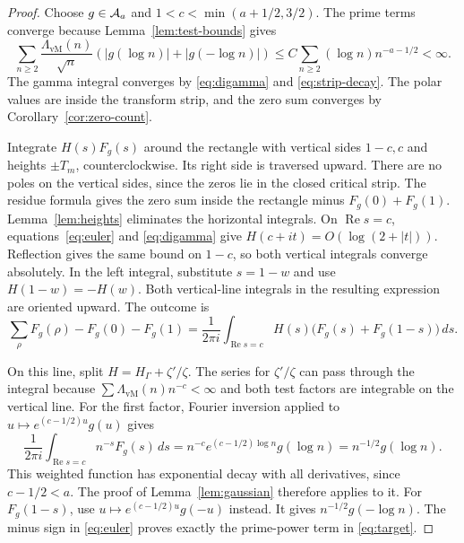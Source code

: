 \begin{proof}
Choose $g\in\mathcal A_a$ and $1<c<\min(a+1/2,3/2)$.
The prime terms converge because Lemma~\ref{lem:test-bounds} gives
\[
 \sum_{n\geq2}\frac{\Lambda_{\mathrm{vM}}(n)}{\sqrt n}
                    (|g(\log n)|+|g(-\log n)|)
 \leq C\sum_{n\geq2}(\log n)n^{-a-1/2}<\infty.
\]
The gamma integral converges by \eqref{eq:digamma} and
\eqref{eq:strip-decay}.  The polar values are inside the transform strip,
and the zero sum converges by Corollary~\ref{cor:zero-count}.

Integrate $H(s)F_g(s)$ around the rectangle with vertical sides $1-c,c$
and heights $\pm T_m$, counterclockwise.  Its right side is traversed upward.
There are no poles on the vertical sides, since the zeros lie in the
closed critical strip.
The residue formula gives the zero sum inside the rectangle minus
$F_g(0)+F_g(1)$.
Lemma~\ref{lem:heights} eliminates the horizontal integrals.
On $\operatorname{Re}s=c$, equations~\eqref{eq:euler} and
\eqref{eq:digamma} give $H(c+it)=O(\log(2+|t|))$.
Reflection gives the same bound on $1-c$, so both vertical integrals
converge absolutely.
In the left integral, substitute $s=1-w$ and use $H(1-w)=-H(w)$.
Both vertical-line integrals in the resulting expression are oriented upward.
The outcome is
\begin{equation}
 \sum_\rho F_g(\rho)-F_g(0)-F_g(1)
 =\frac1{2\pi i}\int_{\operatorname{Re}s=c}
           H(s)\bigl(F_g(s)+F_g(1-s)\bigr)\,ds.
 \label{eq:spine-contour}
\end{equation}

On this line, split $H=H_\Gamma+\zeta'/\zeta$.
The series for $\zeta'/\zeta$ can pass through the integral because
$\sum\Lambda_{\mathrm{vM}}(n)n^{-c}<\infty$ and both test factors are integrable
on the vertical line.
For the first factor, Fourier inversion applied to
$u\mapsto e^{(c-1/2)u}g(u)$ gives
\begin{equation}
 \frac1{2\pi i}\int_{\operatorname{Re}s=c}n^{-s}F_g(s)\,ds
 =n^{-c}e^{(c-1/2)\log n}g(\log n)
 =n^{-1/2}g(\log n).
 \label{eq:prime-inversion}
\end{equation}
This weighted function has exponential decay with all derivatives, since
$c-1/2<a$.  The proof of Lemma~\ref{lem:gaussian} therefore applies to it.
For $F_g(1-s)$, use $u\mapsto e^{(c-1/2)u}g(-u)$ instead.
It gives $n^{-1/2}g(-\log n)$.
The minus sign in \eqref{eq:euler} proves exactly the prime-power term in
\eqref{eq:target}.


\end{proof}
